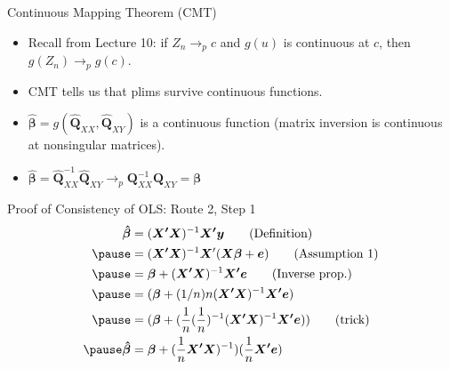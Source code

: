 \documentclass[aspectratio=169, handout, t]{beamer}
\numberwithin{equation}{section}
\begin{document}

\begin{frame}{Continuous Mapping Theorem (CMT)}
\begin{itemize}
\item Recall from Lecture 10: if $Z_n\rightarrow_p c$ and $g(u)$ is continuous at $c$, then $g(Z_n)\rightarrow_p g(c)$.\pause
\item CMT tells us that plims survive continuous functions.\pause
\item $\bm{\hat{\beta}}=g(\bm{\hat{Q}}_{XX}, \bm{\hat{Q}}_{XY})$ is a continuous function (matrix inversion is continuous at nonsingular matrices).\pause
\item $\bm{\hat{\beta}}=\bm{\hat{Q}}_{XX}^{-1}\bm{\hat{Q}}_{XY}\rightarrow_p \bm{Q}_{XX}^{-1}\bm{Q}_{XY}=\bm{\beta}$
\end{itemize}
\end{frame}


\begin{frame}{Proof of Consistency of OLS: Route 2, Step 1}
\begin{align*}
\bm{\hat{\beta}}&=(\bm{X'X})^{-1}\bm{X'y} \tag{Definition}\\ \pause
&=(\bm{X'X})^{-1}\bm{X}'(\bm{X}\bm{\beta}+\bm{e}) \tag{Assumption 1}\\  \pause
&=\bm{\beta}+(\bm{X'X})^{-1}\bm{X'e} \tag{Inverse prop.}\\  \pause
&=(\bm{\beta}+(1/n)n(\bm{X'X})^{-1}\bm{X'e}) \\ \pause
&=(\bm{\beta}+(\frac{1}{n}(\frac{1}{n})^{-1}(\bm{X'X})^{-1}\bm{X'e})) \tag{trick}\\ \pause
\bm{\hat{\beta}}&=\bm{\beta}+(\frac{1}{n}\bm{X'X})^{-1}) ( \frac{1}{n}\bm{X'e})
\end{align*}
 \end{frame}

\end{document}
